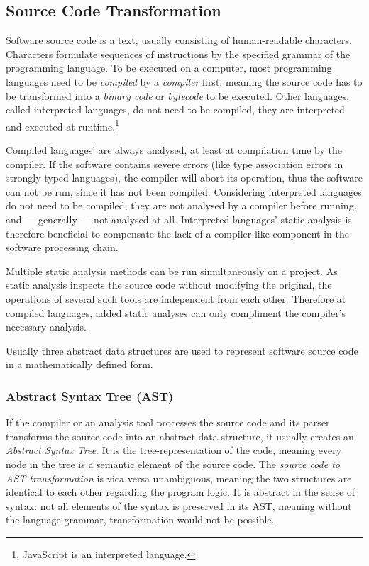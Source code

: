\subsection{Source Code Transformation}

Software source code is a text, usually consisting of human-readable characters. Characters formulate sequences of instructions by the specified grammar of the programming language. To be executed on a computer, most programming languages need to be \emph{compiled} by a \emph{compiler} first, meaning the source code has to be transformed into a \emph{binary code} or \emph{bytecode} to be executed. Other languages, called interpreted languages, do not need to be compiled, they are interpreted and executed at runtime.\footnote{JavaScript is an interpreted language.}

Compiled languages' are always analysed, at least at compilation time by the compiler. If the software contains severe errors (like type association errors in strongly typed languages), the compiler will abort its operation, thus the software can not be run, since it has not been compiled. Considering interpreted languages do not need to be compiled, they are not analysed by a compiler before running, and — generally — not analysed at all. Interpreted languages' static analysis is therefore beneficial to compensate the lack of a compiler-like component in the software processing chain.

Multiple static analysis methods can be run simultaneously on a project. As static analysis inspects the source code without modifying the original, the operations of several such tools are independent from each other. Therefore at compiled languages, added static analyses can only compliment the compiler's necessary analysis.

Usually three abstract data structures are used to represent software source code in a mathematically defined form.


\subsubsection{Abstract Syntax Tree (AST)}

If the compiler or an analysis tool processes the source code and its parser transforms the source code into an abstract data structure, it usually creates an \emph{Abstract Syntax Tree}. It is the tree-representation of the code, meaning every node in the tree is a semantic element of the source code. The \emph{source code to AST transformation} is vica versa unambiguous, meaning the two structures are identical to each other regarding the program logic. It is abstract in the sense of syntax: not all elements of the syntax is preserved in its AST, meaning without the language grammar, transformation would not be possible.


